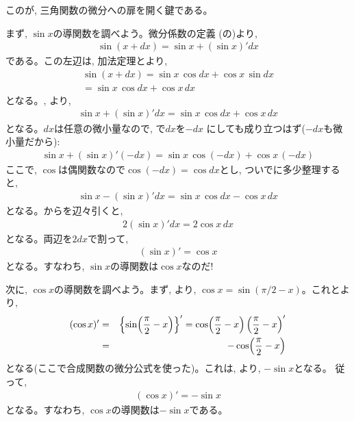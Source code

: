 このが, 三角関数の微分への扉を開く鍵である。

まず, $\sin x$の導関数を調べよう。微分係数の定義
(の)より, 
\begin{eqnarray}
\sin(x+dx) = \sin x + (\sin x)' dx\label{eq:deriv_sin03}
\end{eqnarray}
である。この左辺は, 加法定理とより, 
\begin{eqnarray}
\sin(x+dx) = \sin x\, \cos dx + \cos x\, \sin dx\nonumber\\
= \sin x\, \cos dx + \cos x\,dx\label{eq:deriv_sin04}
\end{eqnarray}
となる。, より, 
\begin{eqnarray}
\sin x + (\sin x)' dx = \sin x\, \cos dx + \cos x\, dx\label{eq:deriv_sin05}
\end{eqnarray}
となる。$dx$は任意の微小量なので, で$dx$を$-dx$
にしても成り立つはず($-dx$も微小量だから):
\begin{eqnarray*}
\sin x + (\sin x)'(-dx) = \sin x\, \cos(-dx) + \cos x\,(-dx)
\end{eqnarray*}
ここで, $\cos$は偶関数なので$\cos(-dx)=\cos dx$とし, ついでに多少整理すると, 
\begin{eqnarray}
\sin x - (\sin x)' dx = \sin x\, \cos dx - \cos x\, dx\label{eq:deriv_sin06}
\end{eqnarray}
となる。からを辺々引くと, 
\begin{eqnarray}
2(\sin x)' dx=2\cos x\,dx\label{eq:deriv_sin07}
\end{eqnarray}
となる。両辺を$2dx$で割って, 
\begin{eqnarray}
(\sin x)'=\cos x\label{eq:diffsin}
\end{eqnarray}
となる。すなわち, $\sin x$の導関数は$\cos x$なのだ!\mv

次に, $\cos x$の導関数を調べよう。まず, より, 
$\cos x=\sin(\pi/2 - x)$。これとより, 
\begin{eqnarray}
(\cos x)'&=&\Bigl\{\sin\Bigl(\frac{\pi}{2} - x\Bigr)\Bigr\}'
         =\cos\Bigl(\frac{\pi}{2} - x\Bigr)\,\Bigl(\frac{\pi}{2} - x\Bigr)'\nonumber\\
         &=&-\cos\Bigl(\frac{\pi}{2} - x\Bigr)
\end{eqnarray}
となる(ここで合成関数の微分公式を使った)。これは, より, $-\sin x$となる。
従って, 
\begin{eqnarray}
(\cos x)'=-\sin x\label{eq:diffcos}
\end{eqnarray}
となる。すなわち, $\cos x$の導関数は$-\sin x$である。\mv

